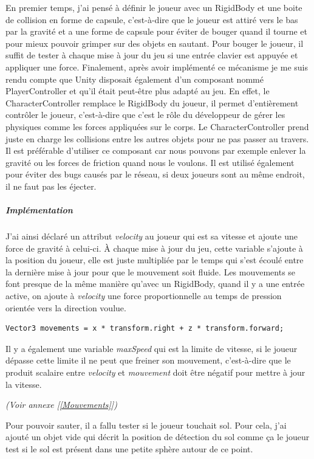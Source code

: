 \documentclass{article}
\begin{document}
En premier temps, j'ai pensé à définir le joueur avec un RigidBody et une boite de collision en forme de capsule, c'est-à-dire que le joueur est attiré vers le bas par la gravité et a une forme de capsule pour éviter de bouger quand il tourne et pour mieux pouvoir grimper sur des objets en sautant. Pour bouger le joueur, il suffit de tester à chaque mise à jour du jeu si une entrée clavier est appuyée et appliquer une force. Finalement, après avoir implémenté ce mécanisme je me suis rendu compte que Unity disposait également d'un composant nommé PlayerController et qu'il était peut-être plus adapté au jeu. En effet, le CharacterController remplace le RigidBody du joueur, il permet d'entièrement contrôler le joueur, c'est-à-dire que c'est le rôle du développeur de gérer les physiques comme les forces appliquées sur le corps. Le CharacterController prend juste en charge les collisions entre les autres objets pour ne pas passer au travers. Il est préférable d'utiliser ce composant car nous pouvons par exemple enlever la gravité ou les forces de friction quand nous le voulons. Il est utilisé également pour éviter des bugs causés par le réseau, si deux joueurs sont au même endroit, il ne faut pas les éjecter.

\subparagraph{Implémentation}

J'ai ainsi déclaré un attribut \emph{velocity} au joueur qui est sa vitesse et ajoute une force de gravité à celui-ci. À chaque mise à jour du jeu, cette variable s'ajoute à la position du joueur, elle est juste multipliée par le temps qui s'est écoulé entre la dernière mise à jour pour que le mouvement soit fluide.
Les mouvements se font presque de la même manière qu'avec un RigidBody, quand il y a une entrée active, on ajoute à \emph{velocity} une force proportionnelle au temps de pression orientée vers la direction voulue.

\begin{lstlisting}
Vector3 movements = x * transform.right + z * transform.forward;
\end{lstlisting}

 Il y a également une variable \emph{maxSpeed} qui est la limite de vitesse, si le joueur dépasse cette limite il ne peut que freiner son mouvement, c'est-à-dire que le produit scalaire entre \emph{velocity} et \emph{mouvement} doit être négatif pour mettre à jour la vitesse.

\emph{(Voir annexe [\ref{Mouvements}])}

Pour pouvoir sauter, il a fallu tester si le joueur touchait sol. Pour cela, j'ai ajouté un objet vide qui décrit la position de détection du sol comme ça le joueur test si le sol est présent dans une petite sphère autour de ce point.
\end{document}
